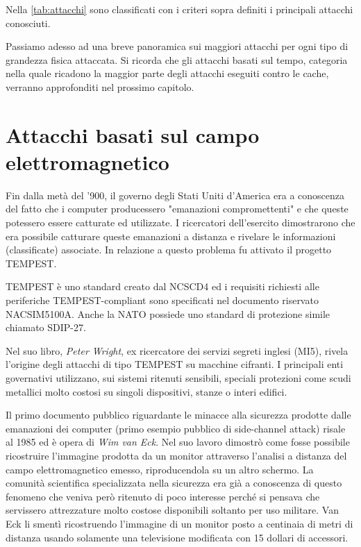 			Nella \cref{tab:attacchi} sono classificati con i criteri sopra definiti i principali attacchi conosciuti.
			
			Passiamo adesso ad una breve panoramica sui maggiori attacchi per ogni tipo di grandezza fisica attaccata. Si ricorda che gli attacchi basati sul tempo, categoria nella quale ricadono la maggior parte degli attacchi eseguiti contro le cache, verranno approfonditi nel prossimo capitolo.
			
	\section{Attacchi basati sul campo elettromagnetico}
		Fin dalla metà del '900, il governo degli Stati Uniti d'America era a conoscenza del fatto che i computer producessero "emanazioni compromettenti" e che queste potessero essere catturate ed utilizzate. I ricercatori dell'esercito dimostrarono che era possibile catturare queste emanazioni a distanza e rivelare le informazioni (classificate) associate. In relazione a questo problema fu attivato il progetto \ac{TEMPEST}.
		
		TEMPEST è uno standard creato dal \ac{NCSCD4} ed i requisiti richiesti alle periferiche TEMPEST-compliant sono specificati nel documento riservato NACSIM5100A. Anche la \acs{NATO} possiede uno standard di protezione simile chiamato SDIP-27.
		
		Nel suo libro\cite{wright1987spycatcher}, \emph{Peter Wright}, ex ricercatore dei servizi segreti inglesi (MI5), rivela l'origine degli attacchi di tipo TEMPEST su macchine cifranti. I principali enti governativi utilizzano, sui sistemi ritenuti sensibili, speciali protezioni come scudi metallici molto costosi su singoli dispositivi, stanze o interi edifici\cite{herndon1990electromagnetic}.
		
		Il primo documento pubblico riguardante le minacce alla sicurezza prodotte dalle emanazioni dei computer (primo esempio pubblico di side-channel attack) risale al 1985 ed è opera di \emph{Wim van Eck}\cite{van1985electromagn}. Nel suo lavoro dimostrò come fosse possibile ricostruire l'immagine prodotta da un monitor attraverso l'analisi a distanza del campo elettromagnetico emesso, riproducendola su un altro schermo. La comunità scientifica specializzata nella sicurezza era già a conoscenza di questo fenomeno che veniva però ritenuto di poco interesse perché si pensava che servissero attrezzature molto costose disponibili soltanto per uso militare. Van Eck li smentì ricostruendo l'immagine di un monitor posto a centinaia di metri di distanza usando solamente una televisione modificata con 15 dollari di accessori.
		
